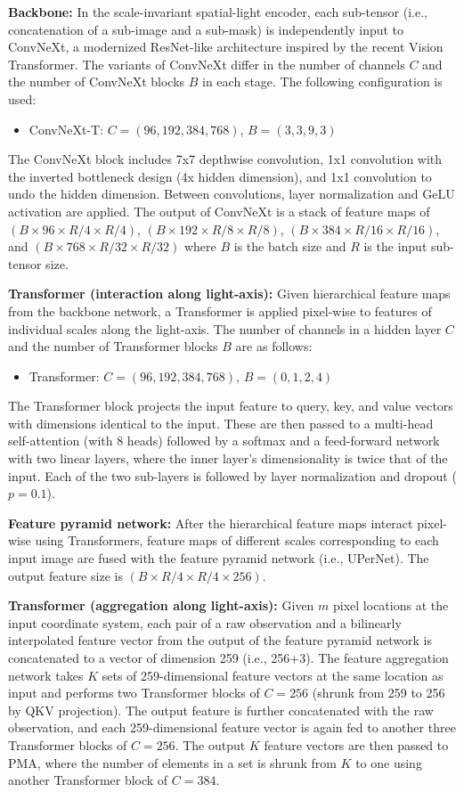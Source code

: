 \textbf{Backbone:} In the scale-invariant spatial-light encoder, each sub-tensor (i.e., concatenation of a sub-image and a sub-mask) is independently input to ConvNeXt, a modernized ResNet-like architecture inspired by the recent Vision Transformer. The variants of ConvNeXt differ in the number of channels $C$ and the number of ConvNeXt blocks $B$ in each stage. The following configuration is used:
\begin{itemize}
    \item ConvNeXt-T: $C = (96, 192, 384, 768)$, $B = (3, 3, 9, 3)$
\end{itemize}
The ConvNeXt block includes 7x7 depthwise convolution, 1x1 convolution with the inverted bottleneck design (4x hidden dimension), and 1x1 convolution to undo the hidden dimension. Between convolutions, layer normalization and GeLU activation are applied. The output of ConvNeXt is a stack of feature maps of $(B \times 96 \times R/4 \times R/4)$, $(B \times 192 \times R/8 \times R/8)$, $(B \times 384 \times R/16 \times R/16)$, and $(B \times 768 \times R/32 \times R/32)$ where $B$ is the batch size and $R$ is the input sub-tensor size.

\textbf{Transformer (interaction along light-axis):} Given hierarchical feature maps from the backbone network, a Transformer is applied pixel-wise to features of individual scales along the light-axis. The number of channels in a hidden layer $C$ and the number of Transformer blocks $B$ are as follows:
\begin{itemize}
    \item Transformer: $C = (96, 192, 384, 768)$, $B = (0, 1, 2, 4)$
\end{itemize}
The Transformer block projects the input feature to query, key, and value vectors with dimensions identical to the input. These are then passed to a multi-head self-attention (with 8 heads) followed by a softmax and a feed-forward network with two linear layers, where the inner layer's dimensionality is twice that of the input. Each of the two sub-layers is followed by layer normalization and dropout ($p = 0.1$).

\textbf{Feature pyramid network:} After the hierarchical feature maps interact pixel-wise using Transformers, feature maps of different scales corresponding to each input image are fused with the feature pyramid network (i.e., UPerNet). The output feature size is $(B \times R/4 \times R/4 \times 256)$.

\textbf{Transformer (aggregation along light-axis):} Given $m$ pixel locations at the input coordinate system, each pair of a raw observation and a bilinearly interpolated feature vector from the output of the feature pyramid network is concatenated to a vector of dimension 259 (i.e., 256+3). The feature aggregation network takes $K$ sets of 259-dimensional feature vectors at the same location as input and performs two Transformer blocks of $C=256$ (shrunk from 259 to 256 by QKV projection). The output feature is further concatenated with the raw observation, and each 259-dimensional feature vector is again fed to another three Transformer blocks of $C=256$. The output $K$ feature vectors are then passed to PMA, where the number of elements in a set is shrunk from $K$ to one using another Transformer block of $C=384$.


